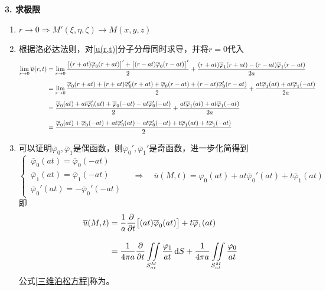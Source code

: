\noindent \textbf{3. 求极限}
\begin{enumerate}[\hspace*{2em} (1) ]
	\item $r \to 0 \Rightarrow M'(\xi, \eta, \zeta) \to M(x,y,z)$
	\item 根据洛必达法则，对\eqref{u(r,t)}分子分母同时求导，并将$r = 0$代入
	\begin{align}
		\lim\limits_{r \to 0} \overline{u}(r,t) & = \lim\limits_{r \to 0 } \dfrac{\big[(r+at)\overline{\varphi}_0(r+at)\big]' + \big[(r-at)\overline{\varphi}_0(r-at)\big]'}{2} + \dfrac{(r + at)\overline{\varphi}_1(r+at)- (r - at)\overline{\varphi}_1(r-at)}{2a}\notag \\[0.5em]
		& = \lim\limits_{r \to 0} \dfrac{\overline{\varphi}_0(r+at)+(r+at)\overline{\varphi}_0'(r+at) + \overline{\varphi}_0(r-at)+ (r-at)\overline{\varphi}_0'(r-at)}{2} + \dfrac{at\overline{\varphi}_1(at)+ at\overline{\varphi}_1(-at)}{2a}\notag \\[0.5em]
		& = \dfrac{\overline{\varphi}_0(at)+at\overline{\varphi}_0'(at) + \overline{\varphi}_0(-at) - at\overline{\varphi}_0'(-at)}{2} + \dfrac{at\overline{\varphi}_1(at)+ at\overline{\varphi}_1(-at)}{2a}\notag \\[0.5em]
		& = \dfrac{\overline{\varphi}_0(at)+\overline{\varphi}_0(-at) + at\overline{\varphi}_0'(at)-at\overline{\varphi}_0'(-at) + t\overline{\varphi}_1(at)+t\overline{\varphi}_1(-at)}{2}
	\end{align}
	\item 可以证明$\overline{\varphi}_0,\overline{\varphi}_1$是偶函数，则$\overline{\varphi}_0',\overline{\varphi}_1'$是奇函数，进一步化简得到
	\begin{equation}
		\begin{cases}
			\, \overline{\varphi}_0(at) = \overline{\varphi}_0(-at)\\
			\, \overline{\varphi}_1(at) = \overline{\varphi}_1(-at)\\
			\, \overline{\varphi}_0'(at) = -\overline{\varphi}_0'(-at)
		\end{cases}
		\quad \Longrightarrow \quad
		\overline{u}(M,t) = \varphi_0(at) + at\overline{\varphi}_0'(at) + t\overline{\varphi}_1(at)
	\end{equation}
	即
	\begin{align}
		\overline{u}(M,t) &= \dfrac{1}{a} \dfrac{\partial }{\partial t} \big[(at)\overline{\varphi}_0(at)\big] + t \overline{\varphi}_1(at) \notag \\[1em]
		& = \dfrac{1}{4 \pi a} \dfrac{\partial }{\partial t}\iint \limits_{S_{at}^M} \dfrac{\varphi_1}{at}\, {\rm{d}} S + \dfrac{1}{4 \pi a} \iint \limits_{S_{at}^M} \dfrac{\varphi_0}{at} 
		\label{三维泊松方程}
	\end{align}
	公式\eqref{三维泊松方程}称为。
\end{enumerate}


